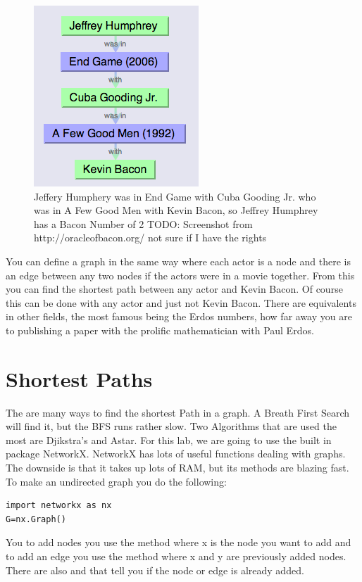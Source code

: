 \begin{figure}[H]
\includegraphics[scale = .6]{Example}
\caption{Jeffery Humphery was in End Game with Cuba Gooding Jr. who was in A Few Good Men with Kevin Bacon, so Jeffrey Humphrey has a Bacon Number of 2 TODO: Screenshot from http://oracleofbacon.org/ not sure if I have the rights}
\end{figure}

You can define a graph in the same way where each actor is a node and there is an edge between any two nodes if the actors were in a movie together. From this you can find the shortest path between any actor and Kevin Bacon. Of course this can be done with any actor and just not Kevin Bacon. There are equivalents in other fields, the most famous being the Erdos numbers, how far away you are to publishing a paper with the prolific mathematician with Paul Erdos.

\section*{Shortest Paths}

The are many ways to find the shortest Path in a graph. A Breath First Search will find it, but the BFS runs rather slow. Two Algorithms that are used the most are Djikstra's and Astar. For this lab, we are going to use the built in package NetworkX. NetworkX has lots of useful functions dealing with graphs. The downside is that it takes up lots of RAM, but its methods are blazing fast. To make an undirected graph you do the following:

\begin{lstlisting}
import networkx as nx
G=nx.Graph()
\end{lstlisting}

You to add nodes you use the  method where x is the node you want to add and to add an edge you use the  method where x and y are previously added nodes. There are also  and  that tell you if the node or edge is already added.

